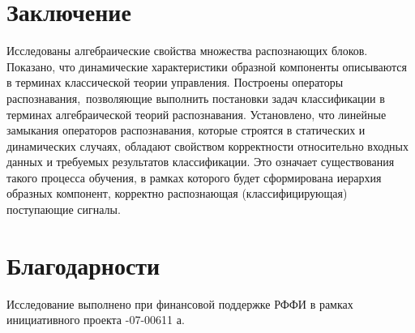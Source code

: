 \documentclass[a4paper, 12pt]{article}
\theoremstyle{plain}
\begin{document}
	\section*{Заключение}
	Исследованы алгебраические свойства множества распознающих блоков. Показано, что динамические характеристики образной компоненты описываются в терминах классической теории управления. Построены операторы распознавания,~позволяющие выполнить постановки задач классификации в терминах алгебраической теорий распознавания. Установлено, что линейные замыкания операторов распознавания, которые строятся в статических и динамических случаях, обладают свойством корректности относительно входных данных и требуемых результатов классификации. Это означает существования такого процесса обучения, в рамках которого будет сформирована иерархия образных компонент, корректно распознающая (классифицирующая) поступающие сигналы.
	
	\section*{Благодарности}
	Исследование выполнено при финансовой поддержке РФФИ в рамках инициативного проекта -07-00611 а.
	
	
\end{document}
